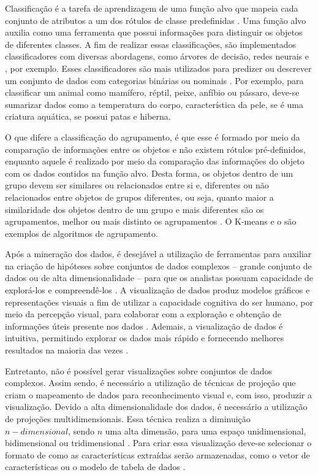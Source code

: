 		Classificação é a tarefa de aprendizagem de uma função alvo que mapeia cada
		conjunto de atributos a um dos rótulos de classe predefinidas \cite{Tan:2005:ch4}.
		Uma função alvo auxilia como uma ferramenta que possui informações para distinguir
		os objetos de diferentes classes. A fim de realizar essas classificações, são
		implementados classificadores com diversas abordagens, como árvores de decisão,
		redes neurais e , por exemplo. Esses
		classificadores são mais utilizados para predizer ou descrever um conjunto
		de dados com categorias binárias ou nominais \cite{Tan:2005:ch4}. Por exemplo,
		para classificar um animal como mamífero, réptil, peixe, anfíbio ou pássaro,
		deve-se sumarizar dados como a temperatura do corpo, característica da pele,
		se é uma criatura aquática, se possui patas e hiberna.
		
		O que difere a classificação do agrupamento, é que esse é formado por meio da
		comparação de informações entre os objetos e não existem rótulos pré-definidos,
		enquanto aquele é realizado por meio da comparação das informações do objeto
		com os dados contidos na função alvo. Desta forma, os objetos dentro de um grupo
		devem ser similares ou relacionados entre si e, diferentes ou não relacionados
		entre objetos de grupos diferentes, ou seja, quanto maior a similaridade dos
		objetos dentro de um grupo e mais diferentes são os agrupamentos, melhor ou
		mais distinto os agrupamentos \cite{Tan:2005:ch8}. O K-means \cite{macqueen1967}
		e o  \cite{Ester1996}
		são exemplos de algoritmos de agrupamento.

		Após a mineração dos dados, é desejável a utilização de ferramentas para
		auxiliar na criação de hipóteses sobre conjuntos de dados complexos -- grande
		conjunto de dados ou de alta dimensionalidade -- para que os analistas possuam
		capacidade de explorá-los e compreendê-los \cite{de2003}. A visualização de dados
		produz modelos gráficos e representações visuais a fim de utilizar a capacidade
		cognitiva do ser humano, por meio da percepção visual, para colaborar com
		a exploração e obtenção de informações úteis presente nos dados \cite{de2003,keim2002}.
		Ademais, a visualização de dados é intuitiva, permitindo explorar os dados
		mais rápido e fornecendo melhores resultados na maioria das vezes \cite{keim2002}.
		
		Entretanto, não é possível gerar visualizações sobre conjuntos de dados
		complexos. Assim sendo, é necessário a utilização de técnicas de projeção que
		criam o mapeamento de dados para reconhecimento visual \cite{friedman1974} e,
		com isso, produzir a visualização. Devido a alta dimensionalidade dos dados,
		é necessário a utilização de projeções multidimensionais. Essa técnica realiza
		a diminuição $n-dimensional$, sendo $n$ uma alta dimensão, para uma espaço
		unidimensional, bidimensional ou tridimensional \cite{paulovich2008least}.
		Para criar essa visualização deve-se selecionar o formato de como as
		características extraídas serão armazenadas, como o vetor de características
		ou o modelo de tabela de dados \cite{de2003}.

